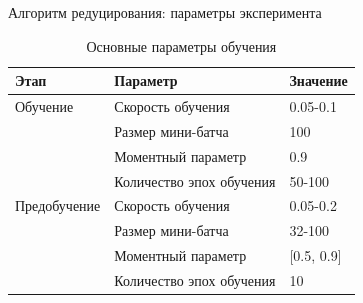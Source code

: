 \documentclass[10pt]{beamer}
\begin{document}
        \begin{frame}{Алгоритм редуцирования: параметры эксперимента}
            \begin{table} [!h]
              \small
              \caption{Основные параметры обучения}\label{table:reduce_training_params}
            \centering
            \begin{tabular}{| p{2cm} | p{5cm} | p{2cm} |}
              \hline
                \textbf{Этап} & \textbf{Параметр} & \textbf{Значение}\\
                \hline
                Обучение & Скорость обучения & 0.05-0.1\\
                \cline{2-3}
                & Размер мини-батча & 100 \\
                \cline{2-3}
                & Моментный параметр & 0.9 \\
                \cline{2-3}
                & Количество эпох обучения & 50-100\\
                \hline
                Предобучение & Скорость обучения & 0.05-0.2\\
                \cline{2-3}
                & Размер мини-батча & 32-100 \\
                \cline{2-3}
                & Моментный параметр & [0.5, 0.9] \\
                \cline{2-3}
                & Количество эпох обучения & 10\\
                \hline
            \end{tabular}
            \end{table}
        \end{frame}
\end{document}
